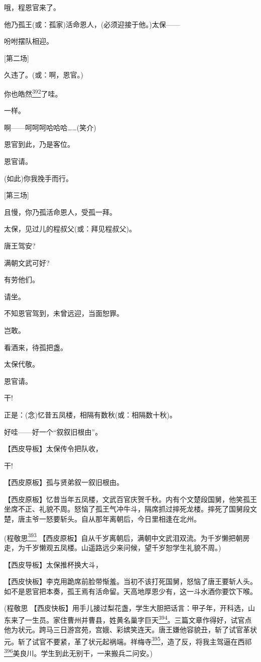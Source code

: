 哦，程恩官来了。

他乃孤王(或：孤家)活命恩人，(必须迎接于他。)太保------

吩咐摆队相迎。

{[}第二场{]}

久违了。(或：啊，恩官。)

你也皓然\protect\hyperlink{fn392}{\textsuperscript{392}}了哇。

一样。

啊------呵呵呵哈哈哈\ldots{}\ldots{}(笑介)

恩官到此，乃是客位。

恩官请。

(如此)你我挽手而行。

{[}第三场{]}

且慢，你乃孤活命恩人，受孤一拜。

太保，见过儿的程叔父(或：拜见程叔父)。

唐王驾安?

满朝文武可好?

有劳他们。

请坐。

不知恩官驾到，未曾远迎，当面恕罪。

岂敢。

看酒来，待孤把盏。

太保代敬。

恩官请。

干!

正是：(念)忆昔五凤楼，相隔有数秋(或：相隔数十秋)。

好哇------好一个``叙叙旧根由''。

【西皮导板】太保传令把队收，

干!

【西皮原板】孤与贤弟叙一叙旧根由。

【西皮原板】忆昔当年五凤楼，文武百官庆贺千秋。内有个文楚段国舅，他笑孤王坐席不正、礼貌不周。怒恼了孤王气冲牛斗，隔席抓过摔死龙楼。摔死了国舅段文楚，唐主爷一怒要斩头。自从那年离朝后，今日里相逢在北州。

(程敬思\protect\hyperlink{fn393}{\textsuperscript{393}}
【西皮原板】自从千岁离朝后，满朝中文武泪双流。为千岁懒把朝房走，为千岁懒观五凤楼。山遥路远少来问候，望千岁恕学生礼貌不周。)

【西皮导板】太保推杯换大斗，

【西皮快板】李克用跪席前脸带惭羞。当初不该打死国舅，怒恼了唐王要斩人头。如不是恩官把本奏，孤王焉有活命留。天高地厚恩少有，这一斗水酒你要饮下喉。

(程敬思
【西皮快板】用手儿接过梨花盏，学生大胆把话言：甲子年，开科选，山东来了一生员。家住曹州并曹县，姓黄名巢字巨天\protect\hyperlink{fn394}{\textsuperscript{394}}。三篇文章作得好，试官点他为状元。跨马三日游宫苑，宫娥、彩嫔笑连天。唐王嫌他容貌丑，斩了试官革状元。斩了试官不要紧，革了状元起祸端。祥梅寺\protect\hyperlink{fn395}{\textsuperscript{395}}，造了反，将我主驾逼在西祁\protect\hyperlink{fn396}{\textsuperscript{396}}美良川。学生到此无别干，一来搬兵二问安。)

